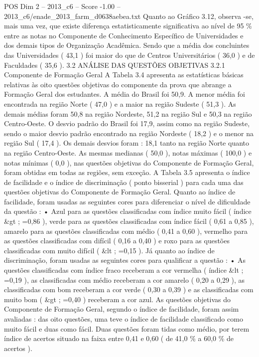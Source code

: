 \begin{textsample}{POS Dim 2 – 2013\_c6 – Score -1.00 – 2013\_c6/enade\_2013\_farm\_d0638aebea.txt}
Quanto ao Gráfico 3.12, observa -se, mais uma vez, que existe diferença estatisticamente significativa ao nível de 95 \% entre as notas no Componente de Conhecimento Específico de Universidades e dos demais tipos de Organização Acadêmica.
Sendo que a média dos concluintes das Universidades ( 43,1 ) foi maior do que de Centros Universitários ( 36,0 ) e de Faculdades ( 35,6 ). 3.2 ANÁLISE DAS QUESTÕES OBJETIVAS 3.2.1 Componente de Formação Geral A Tabela 3.4 apresenta as estatísticas básicas relativas às oito questões objetivas do componente da prova que abrange a Formação Geral dos estudantes.
A média do Brasil foi 50,9.
A menor média foi encontrada na região Norte ( 47,0 ) e a maior na região Sudeste ( 51,3 ).
As demais médias foram 50,8 na região Nordeste, 51,2 na região Sul e 50,3 na região Centro-Oeste.
O desvio padrão do Brasil foi 17,9, assim como na região Sudeste, sendo o maior desvio padrão encontrado na região Nordeste ( 18,2 ) e o menor na região Sul ( 17,4 ).
Os demais desvios foram : 18,1 tanto na região Norte quanto na região Centro-Oeste.
As mesmas medianas ( 50,0 ), notas máximas ( 100,0 ) e notas mínimas ( 0,0 ), nas questões objetivas do Componente de Formação Geral, foram obtidas em todas as regiões, sem exceção.
A Tabela 3.5 apresenta o índice de facilidade e o índice de discriminação ( ponto bisserial ) para cada uma das questões objetivas do Componente de Formação Geral.
Quanto ao índice de facilidade, foram usadas as seguintes cores para diferenciar o nível de dificuldade da questão : • Azul para as questões classificadas com índice muito fácil ( índice \&gt ; =0,86 ), verde para as questões classificadas com índice fácil ( 0,61 a 0,85 ), amarelo para as questões classificadas com médio ( 0,41 a 0,60 ), vermelho para as questões classificadas com difícil ( 0,16 a 0,40 ) e roxo para as questões classificadas com muito difícil ( \&lt ; =0,15 ).
Já quanto ao índice de discriminação, foram usadas as seguintes cores para qualificar a questão : • As questões classificadas com índice fraco receberam a cor vermelha ( índice \&lt ; =0,19 ), as classificadas com médio receberam a cor amarelo ( 0,20 a 0,29 ), as classificadas com bom receberam a cor verde ( 0,30 a 0,39 ) e as classificadas com muito bom ( \&gt ; =0,40 ) receberam a cor azul.
As questões objetivas do Componente de Formação Geral, segundo o índice de facilidade, foram assim avaliadas : das oito questões, uma teve o índice de facilidade classificado como muito fácil e duas como fácil.
Duas questões foram tidas como médio, por terem índice de acertos situado na faixa entre 0,41 e 0,60 ( de 41,0 \% a 60,0 \% de acertos ).

\end{textsample}
